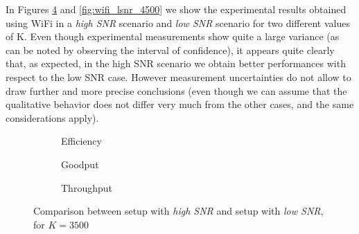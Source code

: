 In Figures \ref{fig:wifi_lsnr_3500} and \ref{fig:wifi_lsnr_4500} we show the experimental results obtained using WiFi in a \textit{high SNR} scenario and \textit{low SNR} scenario for two different values of K. Even though experimental measurements show quite a large variance (as can be noted by observing the interval of confidence), it appears quite clearly that, as expected, in the high SNR scenario we obtain better performances with respect to the low SNR case. However measurement uncertainties do not allow to draw further and more precise conclusions (even though we can assume that the qualitative behavior does not differ very much from the other cases, and the same considerations apply).
\begin{figure}[!hp]
\centering
\begin{subfigure}{0.23\textwidth}
	\captionsetup{justification=centering,font=scriptsize}
	\centering
	\setlength\fwidth{\textwidth}
	\setlength{}
	
	\caption{Efficiency}
	\label{fig:wifi_eff_lsnr_3500}
\end{subfigure}\hspace{2em}%
\begin{subfigure}{0.23\textwidth}
	\captionsetup{justification=centering,font=scriptsize}
	\centering
	\setlength\fwidth{\textwidth}
	\setlength{}
	
	\caption{Goodput}
	\label{fig:wifi_good_lsnr_3500}
\end{subfigure}\hspace{2em}%
\begin{subfigure}{0.23\textwidth}
	\captionsetup{justification=centering,font=scriptsize}
	\centering
	\setlength\fwidth{\textwidth}
	\setlength{}
	
	\caption{Throughput}
	\label{fig:wifi_thr_lsnr_3500}
\end{subfigure}
\caption{Comparison between setup with \textit{high SNR} and setup with \textit{low SNR}, for $K=3500$}
\label{fig:wifi_lsnr_3500}
\end{figure}
